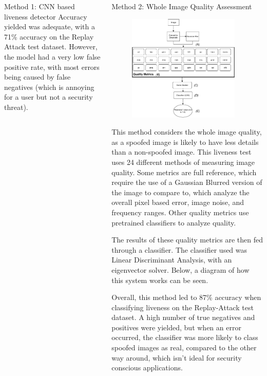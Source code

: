 \documentclass[final]{beamer}
\begin{document}
\begin{frame}{}
\begin{columns}[t]
\begin{column}{.48\linewidth}
\begin{block}{Method 1: CNN based liveness detector}
          Accuracy yielded was adequate, with a 71\% accuracy on the Replay Attack test dataset. 
          However, the model had a very low false positive rate,
          with most errors being caused by false negatives (which is annoying for a user but not a security threat).

        \end{block}
      \end{column}

      \begin{column}{.48\linewidth}
        \begin{block}{Method 2: Whole Image Quality Assessment}
          \begin{figure}
            \includegraphics[width=200px]{ImageQualityLivenessTest.pdf}
          \end{figure}
          This method considers the whole image quality, as a spoofed image is likely to have less details than a non-spoofed image.
          This liveness test uses 24 different methods of measuring image quality. Some metrics are full reference, which require the use of a Gaussian Blurred
          version of the image to compare to, which analyze the overall pixel based error, image noise, and frequency ranges. Other quality metrics use pretrained classifiers
          to analyze quality.
        
          The results of these quality metrics are then fed through a classifier. The classifier used was Linear Discriminant Analysis, with an eigenvector solver.
          Below, a diagram of how this system works can be seen.

          Overall, this method led to 87\% accuracy when classifying liveness on the Replay-Attack test dataset. 
          A high number of true negatives and positives were yielded, but when an error occurred, the classifier was more likely to class
          spoofed images as real, compared to the other way around, which isn't ideal for security conscious applications.


\end{block}
\end{column}
\end{columns}
\end{frame}
\end{document}
